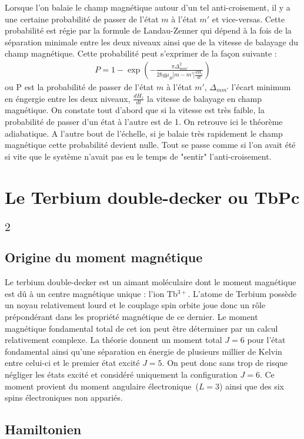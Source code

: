 Lorsque l'on balaie le champ magnétique autour d'un tel anti-croisement, il y a une certaine probabilité de passer de l'état $m$ à l'état $m'$ et vice-versas. Cette probabilité est régie par la formule de Landau-Zenner qui dépend à la fois de la séparation minimale entre les deux niveaux ainsi que de la vitesse de balayage du champ magnétique. Cette probabilité peut s'exprimer de la façon suivante :
\begin{eqnarray}
P = 1 - \exp \left( -\frac{\pi \Delta^2_{mm'}}{2 \hbar g \mu_B |m-m'|\frac{dH_z}{dt}} \right)
\end{eqnarray}
ou P est la probabilité de passer de l'état $m$ à l'état $m'$, $\Delta_{mm'}$ l'écart minimum en éngergie entre les deux niveaux, $\frac{dH_z}{dt}$ la vitesse de balayage en champ magnétique. On constate tout d'abord que si la vitesse est très faible, la probabilité de passer d'un état à l'autre est de 1. On retrouve ici le théorème adiabatique. A l'autre bout de l'échelle, si je balaie très rapidement le champ magnétique cette probabilité devient nulle. Tout se passe comme si l'on avait été si vite que le système n'avait pas eu le temps de "sentir" l'anti-croisement.

\section{Le Terbium double-decker ou TbPc$_2$}

\subsection{Origine du moment magnétique}
Le terbium double-decker est un aimant moléculaire dont le moment magnétique est d\^u à un centre magnétique unique : l'ion Tb$^{3+}$. L'atome de Terbium possède un noyau relativement lourd et le couplage spin orbite joue donc un r\^ole prépondérant dans les propriété magnétique de ce dernier. Le moment magnétique fondamental total de cet ion peut \^etre déterminer par un calcul relativement complexe. La théorie donnent un moment total $J=6$ pour l'état fondamental ainsi qu'une séparation en énergie de plusieurs millier de Kelvin entre celui-ci et le premier état excité $J=5$. On peut donc sans trop de risque négliger les états excité et considéré uniquement la configuration $J=6$. Ce moment provient du moment angulaire électronique~($L=3$) ainsi que des six spins électroniques non appariés. 

\subsection{Hamiltonien}

